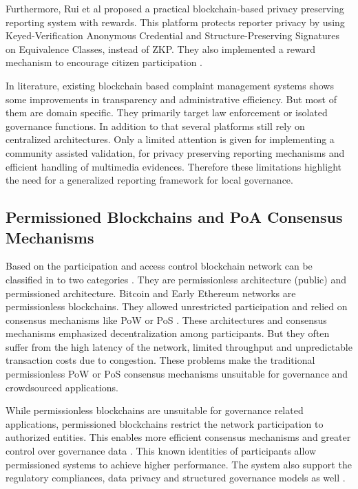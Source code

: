 Furthermore, Rui et al proposed a practical blockchain-based privacy preserving reporting system with rewards. This platform protects reporter privacy by using  Keyed-Verification Anonymous Credential and Structure-Preserving Signatures on Equivalence Classes, instead of \ac{ZKP}. They also implemented a reward mechanism to encourage citizen participation \cite{lin2023prirpt}. 

In literature, existing blockchain based complaint management systems shows some improvements in transparency and administrative efficiency. But most of them are domain specific. They primarily target law enforcement or isolated governance functions. In addition to that several platforms still rely on centralized architectures. Only a limited attention is given for implementing a community assisted validation, for privacy preserving reporting mechanisms and efficient handling of multimedia evidences. Therefore these limitations highlight the need for a generalized reporting framework for local governance.

\subsection{Permissioned Blockchains and \ac{PoA} Consensus Mechanisms}

Based on the participation and access control blockchain network can be classified in to two categories \cite{und2026commledger}. They are permissionless architecture (public) and permissioned architecture. Bitcoin and Early Ethereum networks are permissionless blockchains. They allowed unrestricted participation and relied on consensus mechanisms like \ac{PoW} or \ac{PoS} \cite{mdpi2023survey}. These architectures and consensus mechanisms emphasized decentralization among participants. But they often suffer from the high latency of the network, limited throughput and unpredictable transaction costs due to congestion. These problems make the traditional permissionless PoW or PoS consensus mechanisms unsuitable for governance and crowdsourced applications\cite{arxiv2024performance}.

While permissionless blockchains are unsuitable for governance related applications, permissioned blockchains restrict the network participation to authorized entities. This enables more efficient consensus mechanisms and greater control over governance data \cite{und2026commledger}. This known identities of participants allow permissioned systems to achieve higher performance. The system also support the regulatory compliances, data privacy and structured governance models as well \cite{mdpi2023unleashing}.

